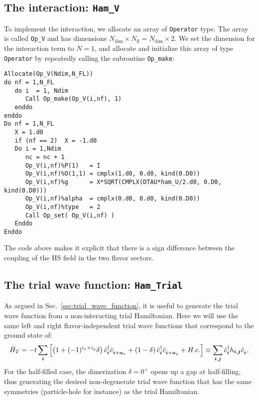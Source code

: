 \subsection{The interaction: \texttt{Ham\_V}}\label{U_PV_Ham_V} 
To implement  the interaction, we allocate an array of \texttt{Operator} type. The array is called  \texttt{Op\_V} and has dimensions $N_{\mathrm{dim}}\times N_{\mathrm{fl}}=N_{\mathrm{dim}} \times 2$. 
We set the dimension for the interaction term to  $N=1$, and  allocate and initialize this array of type  \texttt{Operator} by repeatedly calling the subroutine \texttt{Op\_make}: 

\begin{lstlisting}[style=fortran]
Allocate(Op_V(Ndim,N_FL))
do nf = 1,N_FL
   do i  = 1, Ndim
      Call Op_make(Op_V(i,nf), 1)
   enddo
enddo
Do nf = 1,N_FL
   X = 1.d0
   if (nf == 2)  X = -1.d0
   Do i = 1,Ndim
      nc = nc + 1
      Op_V(i,nf)%P(1)   = I
      Op_V(i,nf)%O(1,1) = cmplx(1.d0, 0.d0, kind(0.D0))
      Op_V(i,nf)%g      = X*SQRT(CMPLX(DTAU*ham_U/2.d0, 0.D0, kind(0.D0))) 
      Op_V(i,nf)%alpha  = cmplx(0.d0, 0.d0, kind(0.D0))
      Op_V(i,nf)%type   = 2
      Call Op_set( Op_V(i,nf) )
   Enddo
Enddo
\end{lstlisting}
The code above makes it explicit that there is a sign difference between the coupling of the HS field in the two flavor sectors. 

\subsection{The trial wave function: \texttt{Ham\_Trial}} \label{U_PV_Ham_Trial}
\label{Sec:Plain_vanilla_trial}
As  argued in Sec.~\ref{sec:trial_wave_function}, it is useful to generate the trial wave function from a non-interacting trial Hamiltonian.   Here we will  use the same left and right  flavor-independent trial wave functions that correspond to the ground state of: 
\begin{equation}
   \hat{H}_T    = - t \sum_{\ve{i}} \left[  \left( 1 + (-1)^{i_x + i_y}  \delta \right)  \hat{c}^{\dagger}_{\ve{i}}   \hat{c}^{\phantom\dagger}_{\ve{i} +\ve{a}_x}  +  
   							\left(1 - \delta \right)  \hat{c}^{\dagger}_{\ve{i}}   \hat{c}^{\phantom\dagger}_{\ve{i} +\ve{a}_y}    + H.c.  \right]   \equiv   \sum_{\ve{i},\ve{j}}  \hat{c}^{\dagger}_{\ve{i}}   h_{\ve{i},\ve{j}}  \hat{c}^{\phantom\dagger}_{\ve{i}}.
\end{equation}
For the half-filled case, the  dimerization $\delta  = 0^{+} $  opens up a gap at  half-filling,   thus generating the desired  non-degenerate  trial wave function  that has the same symmetries (particle-hole  for instance) as  the   trial  Hamiltonian.

